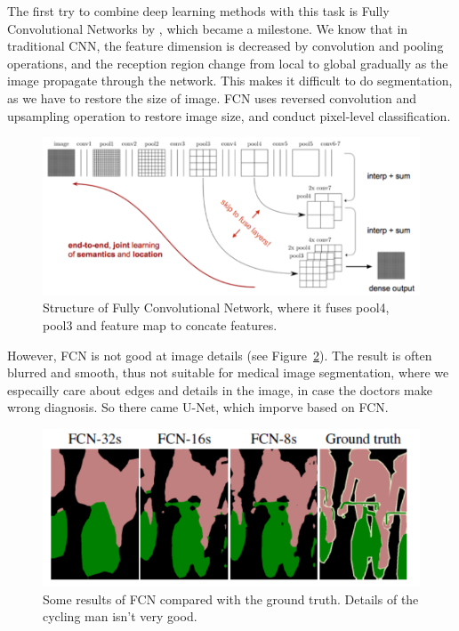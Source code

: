 The first try to combine deep learning methods with this task is Fully Convolutional Networks by \cite{FCN}, which became a milestone. We know that in traditional CNN, the feature dimension is decreased by convolution and pooling operations, and the reception region change from local to global gradually as the image propagate through the network. This makes it difficult to do segmentation, as we have to restore the size of image. FCN uses reversed convolution and upsampling operation to restore image size, and conduct pixel-level classification.
\begin{figure}[!htpb]
    \centering
    \includegraphics[scale=0.3]{figuras/FCN.PNG}
    \caption{Structure of Fully Convolutional Network, where it fuses pool4, pool3 and feature map to concate features.}
    \label{fig:fcn}
\end{figure}

However, FCN is not good at image details (see Figure~\ref{fig:fcnd}). The result is often blurred and smooth, thus not suitable for medical image segmentation, where we especailly care about edges and details in the image, in case the doctors make wrong diagnosis. So there came U-Net, which imporve based on FCN. 

\begin{figure}[!htpb]
    \centering
    \includegraphics[scale=0.5]{figuras/FCNdetail.PNG}
    \caption{Some results of FCN compared with the ground truth. Details of the cycling man isn't very good.}
    \label{fig:fcnd}
\end{figure}

